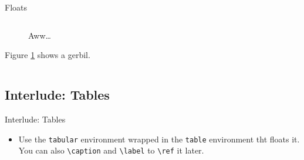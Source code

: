 \documentclass[,aspectratio=43]{beamer}
\newenvironment{Shaded}{\begin{snugshade}}{\end{snugshade}}
\newcommand{\ExtensionTok}[1]{#1}
\newcommand{\FunctionTok}[1]{\textcolor[rgb]{0.02,0.16,0.49}{#1}}
\newcommand{\KeywordTok}[1]{\textcolor[rgb]{0.00,0.44,0.13}{\textbf{#1}}}
\newcommand{\NormalTok}[1]{#1}
\newcommand{\OperatorTok}[1]{\textcolor[rgb]{0.40,0.40,0.40}{#1}}
\providecommand{\tightlist}{%
  \setlength{\itemsep}{0pt}\setlength{\parskip}{0pt}}
\begin{document}
\begin{frame}[fragile]{Floats}
\begin{columns}[T]
\begin{column}{0.36\textwidth}
\begin{figure}
{}

\caption{Aww\ldots}\label{fig:gerbilcap}
\end{figure}

\vspace{-0.5em}

Figure \ref{fig:gerbilcap} shows a gerbil.
\end{column}
\end{columns}
\end{frame}

\hypertarget{interlude-tables}{%
\subsection{Interlude: Tables}\label{interlude-tables}}

\begin{frame}[fragile]{Interlude: Tables}
\begin{itemize}
\tightlist
\item
  Use the \texttt{tabular} environment wrapped in the \texttt{table}
  environment tht floats it. You can also
  \texttt{\textbackslash{}caption} and \texttt{\textbackslash{}label} to
  \texttt{\textbackslash{}ref} it later.
\end{itemize}

\begin{columns}[T]
\begin{column}{0.48\textwidth}
\footnotesize
\vspace{-1em}

\begin{Shaded}
\end{Shaded}
\end{column}


\end{columns}
\end{frame}
\end{document}
